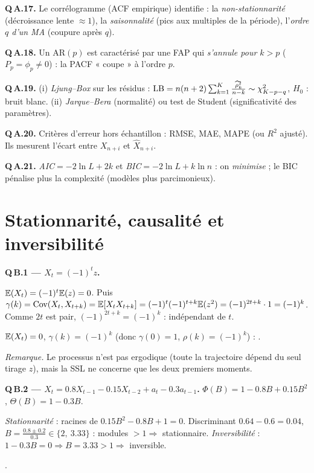 \documentclass[11pt]{article}
\begin{document}
\textbf{Q\,A.17.} Le corrélogramme (ACF empirique) identifie : la \emph{non-stationnarité}
(décroissance lente $\approx1$), la \emph{saisonnalité} (pics aux multiples de la période),
l'\emph{ordre $q$ d'un MA} (coupure après $q$).

\textbf{Q\,A.18.} Un AR$(p)$ est caractérisé par une FAP qui \emph{s'annule pour $k>p$}
($P_p=\phi_p\ne0$) : la PACF « coupe » à l'ordre $p$.

\textbf{Q\,A.19.} (i) \emph{Ljung--Box} sur les résidus :
$\mathrm{LB}=n(n+2)\sum_{k=1}^K\frac{\widehat{\rho}_k^2}{n-k}\sim\chi^2_{K-p-q}$, $H_0$ : bruit blanc.
(ii) \emph{Jarque--Bera} (normalité) ou test de Student (significativité des paramètres).

\textbf{Q\,A.20.} Critères d'erreur hors échantillon : RMSE, MAE, MAPE (ou $R^2$ ajusté). Ils
mesurent l'écart entre $X_{n+i}$ et $\widehat X_{n+i}$.

\textbf{Q\,A.21.} \emph{AIC}$=-2\ln L+2k$ et \emph{BIC}$=-2\ln L+k\ln n$ : on \emph{minimise} ;
le BIC pénalise plus la complexité (modèles plus parcimonieux).

\section{Stationnarité, causalité et inversibilité}

\textbf{Q\,B.1 --- $X_t=(-1)^tz$.}
\begin{etapes}
$\mathbb{E}(X_t)=(-1)^t\mathbb{E}(z)=0$. Puis
$\gamma(k)=\operatorname{Cov}(X_t,X_{t+k})=\mathbb{E}[X_tX_{t+k}]=(-1)^t(-1)^{t+k}\mathbb{E}(z^2)=(-1)^{2t+k}\cdot1=(-1)^k$.
Comme $2t$ est pair, $(-1)^{2t+k}=(-1)^k$ : indépendant de $t$.
\end{etapes}
\begin{reponse}$\mathbb{E}(X_t)=0$, $\gamma(k)=(-1)^k$ (donc $\gamma(0)=1$, $\rho(k)=(-1)^k$) :
.\end{reponse}
\emph{Remarque.} Le processus n'est pas ergodique (toute la trajectoire dépend du seul tirage
$z$), mais la SSL ne concerne que les deux premiers moments.

\textbf{Q\,B.2 --- $X_t=0.8X_{t-1}-0.15X_{t-2}+a_t-0.3a_{t-1}$.}
$\Phi(B)=1-0.8B+0.15B^2$, $\Theta(B)=1-0.3B$.
\begin{etapes}
\emph{Stationnarité} : racines de $0.15B^2-0.8B+1=0$. Discriminant $0.64-0.6=0.04$,
$B=\frac{0.8\pm0.2}{0.3}\in\{2,\ 3.33\}$ : modules $>1\Rightarrow$ stationnaire.
\emph{Inversibilité} : $1-0.3B=0\Rightarrow B=3.33>1\Rightarrow$ inversible.
\end{etapes}
\begin{reponse}.\end{reponse}
\end{document}

